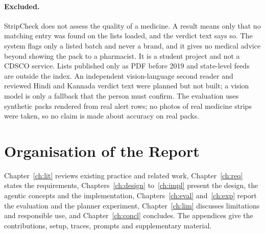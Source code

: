 \paragraph{Excluded.} StripCheck does not assess the quality of a medicine. A \NLISTED{} result
means only that no matching entry was found on the lists loaded, and the verdict text says so.
The system flags only a listed batch and never a brand, and it gives no medical advice beyond
showing the pack to a pharmacist. It is a student project and not a CDSCO service. Lists published
only as PDF before 2019 and state-level feeds are outside the index. An independent vision-language
second reader and reviewed Hindi and Kannada verdict text were planned but not built; a vision model
is only a fallback that the person must confirm. The evaluation uses
synthetic packs rendered from real alert rows; no photos of real medicine strips were taken, so no
claim is made about accuracy on real packs.

\section{Organisation of the Report}
\label{sec:intro-organisation-of-the-report}

Chapter~\ref{ch:lit} reviews existing practice and related work, Chapter~\ref{ch:req} states the
requirements, Chapters~\ref{ch:design} to~\ref{ch:impl} present the design, the agentic concepts
and the implementation, Chapters~\ref{ch:eval} and~\ref{ch:exp} report the evaluation and the
planner experiment, Chapter~\ref{ch:lim} discusses limitations and responsible use, and
Chapter~\ref{ch:concl} concludes. The appendices give the contributions, setup, traces, prompts and supplementary material.
